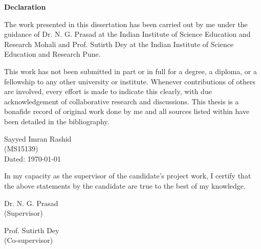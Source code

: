 \begin{center}
\Large  {\bf Declaration }
\end{center}
\vspace{0.5in}
The work presented in this dissertation has been carried out by me under the guidance of Dr. N. G. Prasad at the Indian Institute of Science Education and Research Mohali and Prof. Sutirth Dey at the Indian Institute of Science Education and Research Pune.

\bigskip

\noindent This work has not been submitted in part or in full for a degree, a diploma, or a fellowship to any other university or institute. Whenever contributions of others are involved, every effort is made to indicate this clearly, with due acknowledgement of collaborative research and discussions. This thesis is a bonafide record of original work done by me and all sources listed within have been detailed in the bibliography.

\vspace{.6in}
\begin{flushright}
Sayyed Imran Rashid\\
(MS15139)\\
Dated: \today
\end{flushright}

\vfill

\noindent In my capacity as the supervisor of the candidate’s project work, I certify that the above statements by the candidate are true to the best of my knowledge.
\vspace{.5in}
\begin{center}
\parbox[t]{0.45\linewidth}{
    \centering
    Dr. N. G. Prasad\\
    (Supervisor)}
\parbox[t]{0.45\linewidth}{
    \centering
    Prof. Sutirth Dey\\
    (Co-supervisor)}
\end{center}
\cleardoublepage
